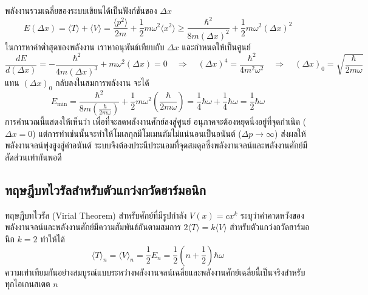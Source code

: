 พลังงานรวมเฉลี่ยของระบบเขียนได้เป็นฟังก์ชันของ $\Delta x$
\begin{equation}
E(\Delta x) = \langle T \rangle + \langle V \rangle = \frac{\langle p^2 \rangle}{2m} + \frac{1}{2}m\omega^2\langle x^2 \rangle \ge \frac{\hbar^2}{8m(\Delta x)^2} + \frac{1}{2}m\omega^2 (\Delta x)^2
\end{equation}
ในการหาค่าต่ำสุดของพลังงาน เราหาอนุพันธ์เทียบกับ $\Delta x$ และกำหนดให้เป็นศูนย์
\begin{equation}
\frac{dE}{d(\Delta x)} = -\frac{\hbar^2}{4m(\Delta x)^3} + m\omega^2(\Delta x) = 0 \quad \Longrightarrow \quad (\Delta x)^4 = \frac{\hbar^2}{4m^2\omega^2} \quad \Longrightarrow \quad (\Delta x)_0 = \sqrt{\frac{\hbar}{2m\omega}}
\end{equation}
แทน $(\Delta x)_0$ กลับลงในสมการพลังงาน จะได้
\begin{equation}
E_{\min} = \frac{\hbar^2}{8m \left(\frac{\hbar}{2m\omega}\right)} + \frac{1}{2}m\omega^2 \left(\frac{\hbar}{2m\omega}\right) = \frac{1}{4}\hbar\omega + \frac{1}{4}\hbar\omega = \frac{1}{2}\hbar\omega
\end{equation}
การคำนวณนี้แสดงให้เห็นว่า เพื่อที่จะลดพลังงานศักย์ลงสู่ศูนย์ อนุภาคจะต้องหยุดนิ่งอยู่ที่จุดกำเนิด ($\Delta x = 0$) แต่การทำเช่นนั้นจะทำให้โมเลกุลมีโมเมนตัมไม่แน่นอนเป็นอนันต์ ($\Delta p \to \infty$) ส่งผลให้พลังงานจลน์พุ่งสูงสู่ค่าอนันต์ ระบบจึงต้องประนีประนอมที่จุดสมดุลซึ่งพลังงานจลน์และพลังงานศักย์มีสัดส่วนเท่ากันพอดี

\subsection{ทฤษฎีบทไวรัลสำหรับตัวแกว่งกวัดฮาร์มอนิก}
ทฤษฎีบทไวรัล (Virial Theorem) สำหรับศักย์ที่มีรูปกำลัง $V(x) = c x^k$ ระบุว่าค่าคาดหวังของพลังงานจลน์และพลังงานศักย์มีความสัมพันธ์กันตามสมการ $2\langle T \rangle = k\langle V \rangle$ สำหรับตัวแกว่งกวัดฮาร์มอนิก $k = 2$ ทำให้ได้
\begin{equation}
\langle T \rangle_n = \langle V \rangle_n = \frac{1}{2}E_n = \frac{1}{2}\left(n + \frac{1}{2}\right)\hbar\omega
\end{equation}
ความเท่าเทียมกันอย่างสมบูรณ์แบบระหว่างพลังงานจลน์เฉลี่ยและพลังงานศักย์เฉลี่ยนี้เป็นจริงสำหรับทุกไอเกนสเตต $n$

